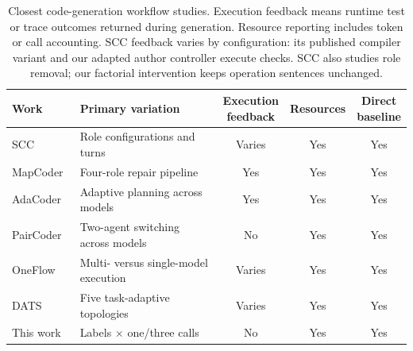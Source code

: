 \begin{table}[t]
\caption{Closest code-generation workflow studies. Execution feedback means runtime test or trace outcomes returned during generation. Resource reporting includes token or call accounting. SCC feedback varies by configuration: its published compiler variant and our adapted author controller execute checks. SCC also studies role removal; our factorial intervention keeps operation sentences unchanged.}
\label{tab:related-designs}
\centering\small
\begin{tabularx}{\linewidth}{@{}lXccc@{}}
\toprule
Work & Primary variation & \shortstack{Execution\\feedback} & Resources & \shortstack{Direct\\baseline}\\
\midrule
SCC~\cite{dong2023selfcollaboration} & Role configurations and turns & Varies & Yes & Yes\\
MapCoder~\cite{islam2024mapcoder} & Four-role repair pipeline & Yes & Yes & Yes\\
AdaCoder~\cite{zhu2026adacoder} & Adaptive planning across models & Yes & Yes & Yes\\
PairCoder~\cite{chen2026paircoder} & Two-agent switching across models & No & Yes & Yes\\
OneFlow~\cite{xu2026oneflow} & Multi- versus single-model execution & Varies & Yes & Yes\\
DATS~\cite{hong2026dats} & Five task-adaptive topologies & Varies & Yes & Yes\\
This work & Labels $\times$ one/three calls & No & Yes & Yes\\
\bottomrule
\end{tabularx}
\end{table}
